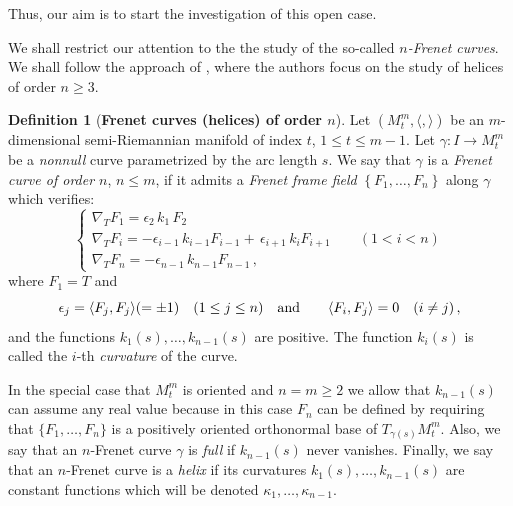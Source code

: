 \documentclass[11pt]{amsart}
\theoremstyle{plain}
\theoremstyle{definition}
\newtheorem{definition}   [theorem]  {Definition}
\numberwithin{equation}{section}
\begin{document}
Thus, our aim is to start the investigation of this open case. 

We shall restrict our attention to the the study of the so-called \textit{$n$-Frenet curves}. We shall follow the approach of \cite{Song, Ziplar}, where the authors focus on the study of helices of order $n\geq 3$.
\begin{definition}[\textbf{Frenet curves (helices) of order $n$}]\label{def-helices-order-n} Let $(M^m_t,\langle, \rangle)$ be an $m$-dimensional semi-Riemannian manifold of index $t$, $1 \leq t \leq m-1$. Let $\gamma:I \to M^m_t$ be a \textit{nonnull} curve parametrized by the arc length $s$. We say that $\gamma$ is a \textit{Frenet curve of order $n$}, $n \leq m$, if it admits a \textit{Frenet frame field} $\left \{F_1,\ldots,F_n \right \}$ along $\gamma$ which verifies:
\begin{equation}\label{Frenet-field-general-pseudo}
\begin{cases}
\nabla_T F_1= \epsilon_2 \,k_1\,F_2 \\
\nabla_T F_i=-\epsilon_{i-1}\,k_{i-1} F_{i-1}+\,\epsilon_{i+1}\,k_i F_{i+1} \qquad (1<i<n)\\
\nabla_T F_n=-\epsilon_{n-1}\,k_{n-1} F_{n-1} \,, 
\end{cases} 
\end{equation}
where $F_1=T$ and 
\[
\epsilon_{j}=\langle F_j,F_j \rangle(=\pm 1) \quad (1\leq j \leq n)\quad {\rm and}\quad  \quad \langle F_i,F_j \rangle=0 \quad (i\neq j) \,,
\]
and the functions $k_1(s), \ldots, k_{n-1}(s)$ are positive. The function $k_i(s)$ is called the $i$-th \textit{curvature} of the curve. 


In the special case that $M^m_t$ is oriented and $n=m\geq 2$ we allow that $k_{n-1}(s)$ can assume any real value because in this case $F_n$ can be defined by requiring that $\{F_1,\ldots,F_n \}$ is a positively oriented orthonormal base of $T_{\gamma(s)}M^m_t$. Also, we say that an $n$-Frenet curve $\gamma$ is \textit{full} if $k_{n-1}(s)$ never vanishes.
Finally, we say that an $n$-Frenet curve is a \textit{helix} if its curvatures $k_1(s), \ldots, k_{n-1}(s)$ are constant functions which will be denoted $\kappa_1, \ldots, \kappa_{n-1}$.
\end{definition}
\end{document}
